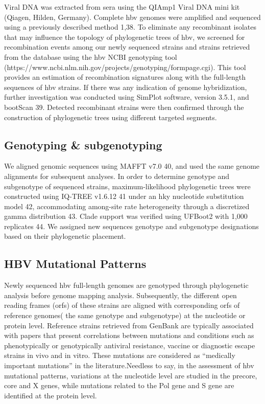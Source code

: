 Viral DNA was extracted from sera using the QIAmp1 Viral DNA mini kit (Qiagen, Hilden, Germany). Complete \gls{hbv} genomes were amplified and sequenced using a previously described method 1,38. To eliminate any recombinant isolates that may influence the topology of phylogenetic trees of \gls{hbv}, we screened for recombination events among our newly sequenced strains and strains retrieved from the database using the \gls{hbv} NCBI genotyping tool (https://www.ncbi.nlm.nih.gov/projects/genotyping/formpage.cgi). This tool provides an estimation of recombination signatures along with the full-length sequences of \gls{hbv} strains. If there was any indication of genome hybridization, further investigation was conducted using SimPlot software, version 3.5.1, and bootScan 39. Detected recombinant strains were then confirmed through the construction of phylogenetic trees using different targeted segments.

\subsection{Genotyping \& subgenotyping}
We aligned genomic sequences using MAFFT v7.0 40, and used the same genome alignments for subsequent analyses. In order to determine genotype and subgenotype of sequenced strains, maximum-likelihood phylogenetic trees were constructed using IQ-TREE v1.6.12 41 under an \gls{hky} nucleotide substitution model 42, accommodating among-site rate heterogeneity through a discretized gamma distribution 43. Clade support was verified using UFBoot2 with 1,000 replicates 44. We assigned new sequences genotype and subgenotype designations based on their phylogenetic placement.

\subsection{HBV Mutational Patterns}
Newly sequenced \gls{hbv} full-length genomes are genotyped through phylogenetic analysis before genome mapping analysis. Subsequently, the different open reading frames (\gls{orf}s) of these strains are aligned with corresponding \gls{orf}s of reference genomes( the same genotype and subgenotype) at the nucleotide or protein level. Reference strains retrieved from GenBank are typically associated with papers that present correlations between mutations and conditions such as phenotypically or genotypically antiviral resistance, vaccine or diagnostic escape strains in vivo and in vitro. These mutations are considered as “medically important mutations” in the literature.Needless to say, in the assessment of \gls{hbv} mutational patterns, variations at the nucleotide level are studied in the precore, core and X genes, while mutations related to the Pol gene and S gene are identified at the protein level.

